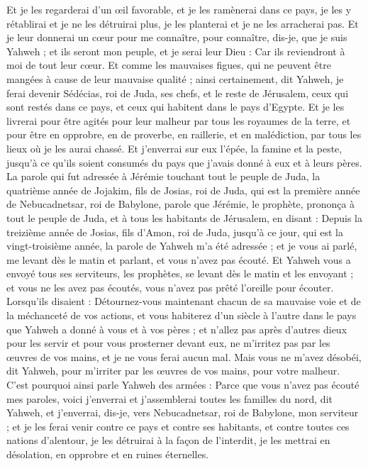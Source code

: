 \begin{multicols}{2}
Et je les regarderai d'un œil favorable, et je les ramènerai dans ce pays, je les y rétablirai et je ne les détruirai plus, je les planterai et je ne les arracherai pas.
Et je leur donnerai un cœur pour me connaître, pour connaître, dis-je, que je suis Yahweh ; et ils seront mon peuple, et je serai leur Dieu : Car ils reviendront à moi de tout leur cœur.
Et comme les mauvaises figues, qui ne peuvent être mangées à cause de leur mauvaise qualité ; ainsi certainement, dit Yahweh, je ferai devenir Sédécias, roi de Juda, ses chefs, et le reste de Jérusalem, ceux qui sont restés dans ce pays, et ceux qui habitent dans le pays d'Egypte.
Et je les livrerai pour être agités pour leur malheur par tous les royaumes de la terre, et pour être en opprobre, en de proverbe, en raillerie, et en malédiction, par tous les lieux où je les aurai chassé.
Et j'enverrai sur eux l'épée, la famine et la peste, jusqu'à ce qu'ils soient consumés du pays que j'avais donné à eux et à leurs pères.
\VerseOne{}La parole qui fut adressée à Jérémie touchant tout le peuple de Juda, la quatrième année de Jojakim, fils de Josias, roi de Juda, qui est la première année de Nebucadnetsar, roi de Babylone,
parole que Jérémie, le prophète, prononça à tout le peuple de Juda, et à tous les habitants de Jérusalem, en disant :
Depuis la treizième année de Josias, fils d'Amon, roi de Juda, jusqu'à ce jour, qui est la vingt-troisième année, la parole de Yahweh m'a été adressée ; et je vous ai parlé, me levant dès le matin et parlant, et vous n'avez pas écouté.
Et Yahweh vous a envoyé tous ses serviteurs, les prophètes, se levant dès le matin et les envoyant ; et vous ne les avez pas écoutés, vous n'avez pas prêté l'oreille pour écouter.
Lorsqu'ils disaient : Détournez-vous maintenant chacun de sa mauvaise voie et de la méchanceté de vos actions, et vous habiterez d'un siècle à l'autre dans le pays que Yahweh a donné à vous et à vos pères ;
et n'allez pas après d'autres dieux pour les servir et pour vous prosterner devant eux, ne m'irritez pas par les œuvres de vos mains, et je ne vous ferai aucun mal.
Mais vous ne m'avez désobéi, dit Yahweh, pour m'irriter par les œuvres de vos mains, pour votre malheur.
C'est pourquoi ainsi parle Yahweh des armées : Parce que vous n'avez pas écouté mes paroles,
voici j'enverrai et j'assemblerai toutes les familles du nord, dit Yahweh, et j'enverrai, dis-je, vers Nebucadnetsar, roi de Babylone, mon serviteur ; et je les ferai venir contre ce pays et contre ses habitants, et contre toutes ces nations d'alentour, je les détruirai à la façon de l'interdit, je les mettrai en désolation, en opprobre et en ruines éternelles.

\end{multicols}
